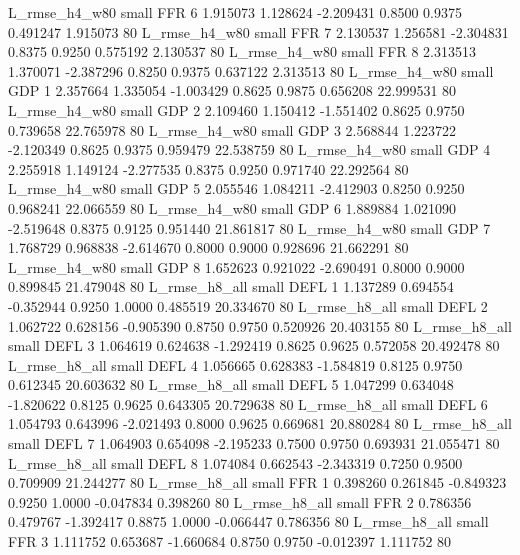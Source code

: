  L_rmse_h4_w80      small      FFR                 6 1.915073 1.128624 -2.209431 0.8500 0.9375  0.491247    1.915073 80
 L_rmse_h4_w80      small      FFR                 7 2.130537 1.256581 -2.304831 0.8375 0.9250  0.575192    2.130537 80
 L_rmse_h4_w80      small      FFR                 8 2.313513 1.370071 -2.387296 0.8250 0.9375  0.637122    2.313513 80
 L_rmse_h4_w80      small      GDP                 1 2.357664 1.335054 -1.003429 0.8625 0.9875  0.656208   22.999531 80
 L_rmse_h4_w80      small      GDP                 2 2.109460 1.150412 -1.551402 0.8625 0.9750  0.739658   22.765978 80
 L_rmse_h4_w80      small      GDP                 3 2.568844 1.223722 -2.120349 0.8625 0.9375  0.959479   22.538759 80
 L_rmse_h4_w80      small      GDP                 4 2.255918 1.149124 -2.277535 0.8375 0.9250  0.971740   22.292564 80
 L_rmse_h4_w80      small      GDP                 5 2.055546 1.084211 -2.412903 0.8250 0.9250  0.968241   22.066559 80
 L_rmse_h4_w80      small      GDP                 6 1.889884 1.021090 -2.519648 0.8375 0.9125  0.951440   21.861817 80
 L_rmse_h4_w80      small      GDP                 7 1.768729 0.968838 -2.614670 0.8000 0.9000  0.928696   21.662291 80
 L_rmse_h4_w80      small      GDP                 8 1.652623 0.921022 -2.690491 0.8000 0.9000  0.899845   21.479048 80
 L_rmse_h8_all      small     DEFL                 1 1.137289 0.694554 -0.352944 0.9250 1.0000  0.485519   20.334670 80
 L_rmse_h8_all      small     DEFL                 2 1.062722 0.628156 -0.905390 0.8750 0.9750  0.520926   20.403155 80
 L_rmse_h8_all      small     DEFL                 3 1.064619 0.624638 -1.292419 0.8625 0.9625  0.572058   20.492478 80
 L_rmse_h8_all      small     DEFL                 4 1.056665 0.628383 -1.584819 0.8125 0.9750  0.612345   20.603632 80
 L_rmse_h8_all      small     DEFL                 5 1.047299 0.634048 -1.820622 0.8125 0.9625  0.643305   20.729638 80
 L_rmse_h8_all      small     DEFL                 6 1.054793 0.643996 -2.021493 0.8000 0.9625  0.669681   20.880284 80
 L_rmse_h8_all      small     DEFL                 7 1.064903 0.654098 -2.195233 0.7500 0.9750  0.693931   21.055471 80
 L_rmse_h8_all      small     DEFL                 8 1.074084 0.662543 -2.343319 0.7250 0.9500  0.709909   21.244277 80
 L_rmse_h8_all      small      FFR                 1 0.398260 0.261845 -0.849323 0.9250 1.0000 -0.047834    0.398260 80
 L_rmse_h8_all      small      FFR                 2 0.786356 0.479767 -1.392417 0.8875 1.0000 -0.066447    0.786356 80
 L_rmse_h8_all      small      FFR                 3 1.111752 0.653687 -1.660684 0.8750 0.9750 -0.012397    1.111752 80
